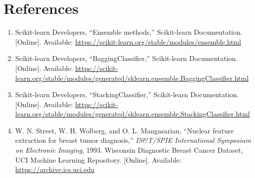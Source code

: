 \documentclass[12pt,a4paper]{article}
\begin{document}
\section{References}
\begin{enumerate}
\item Scikit-learn Developers, ``Ensemble methods,'' Scikit-learn Documentation. [Online].
Available: \url{https://scikit-learn.org/stable/modules/ensemble.html}
\item Scikit-learn Developers, ``BaggingClassifier,'' Scikit-learn Documentation. [Online].
Available: \url{https://scikit-learn.org/stable/modules/generated/sklearn.ensemble.BaggingClassifier.html}
\item Scikit-learn Developers, ``StackingClassifier,'' Scikit-learn Documentation. [Online].
Available: \url{https://scikit-learn.org/stable/modules/generated/sklearn.ensemble.StackingClassifier.html}
\item W. N. Street, W. H. Wolberg, and O. L. Mangasarian, ``Nuclear feature extraction for
breast tumor diagnosis,'' \textit{IS\&T/SPIE International Symposium on Electronic Imaging},
1993. Wisconsin Diagnostic Breast Cancer Dataset, UCI Machine Learning Repository. [Online].
Available: \url{https://archive.ics.uci.edu}
\end{enumerate}
\end{document}
